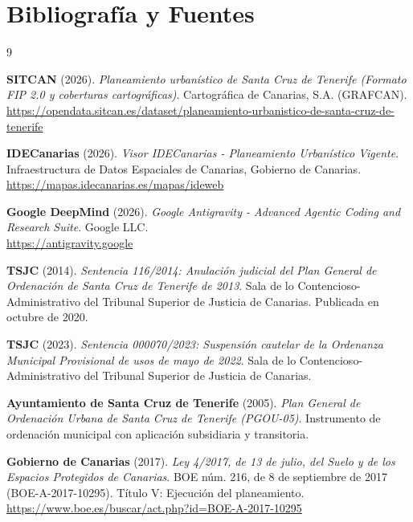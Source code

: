 \section{Bibliografía y Fuentes}

\begin{thebibliography}{9}
\sloppy

\textbf{SITCAN} (2026). \emph{Planeamiento urbanístico de Santa Cruz de Tenerife (Formato FIP 2.0 y coberturas cartográficas)}. Cartográfica de Canarias, S.A. (GRAFCAN). \\
\url{https://opendata.sitcan.es/dataset/planeamiento-urbanistico-de-santa-cruz-de-tenerife}

\textbf{IDECanarias} (2026). \emph{Visor IDECanarias - Planeamiento Urbanístico Vigente}. Infraestructura de Datos Espaciales de Canarias, Gobierno de Canarias. \\
\url{https://mapas.idecanarias.es/mapas/ideweb}

\textbf{Google DeepMind} (2026). \emph{Google Antigravity - Advanced Agentic Coding and Research Suite}. Google LLC. \\
\url{https://antigravity.google}

\textbf{TSJC} (2014). \emph{Sentencia 116/2014: Anulación judicial del Plan General de Ordenación de Santa Cruz de Tenerife de 2013}. Sala de lo Contencioso-Administrativo del Tribunal Superior de Justicia de Canarias. Publicada en octubre de 2020.

\textbf{TSJC} (2023). \emph{Sentencia 000070/2023: Suspensión cautelar de la Ordenanza Municipal Provisional de usos de mayo de 2022}. Sala de lo Contencioso-Administrativo del Tribunal Superior de Justicia de Canarias.

\textbf{Ayuntamiento de Santa Cruz de Tenerife} (2005). \emph{Plan General de Ordenación Urbana de Santa Cruz de Tenerife (PGOU-05)}. Instrumento de ordenación municipal con aplicación subsidiaria y transitoria.

\textbf{Gobierno de Canarias} (2017). \emph{Ley 4/2017, de 13 de julio, del Suelo y de los Espacios Protegidos de Canarias}. BOE núm. 216, de 8 de septiembre de 2017 (BOE-A-2017-10295). Título V: Ejecución del planeamiento. \\
\url{https://www.boe.es/buscar/act.php?id=BOE-A-2017-10295}

\end{thebibliography}
